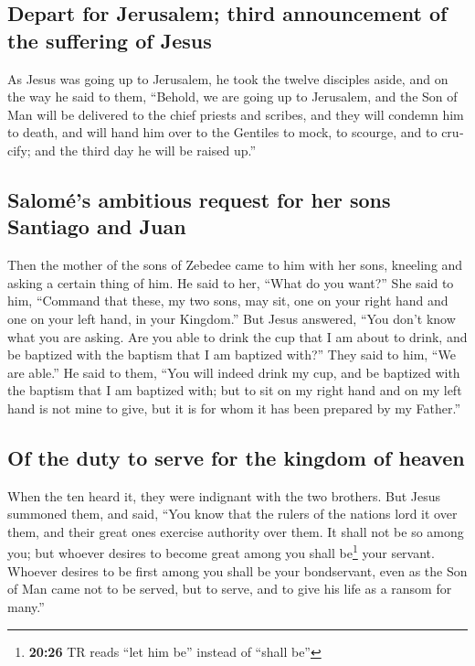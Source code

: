 \begin{paracol}{2}
\begin{otherlanguage}{english}
\hypertarget{depart-for-jerusalem-third-announcement-of-the-suffering-of-jesus}{%
\subsection{Depart for Jerusalem; third announcement of the suffering of
Jesus}\label{depart-for-jerusalem-third-announcement-of-the-suffering-of-jesus}}

 As Jesus was going up to Jerusalem, he took the twelve
disciples aside, and on the way he said to them, 
``Behold, we are going up to Jerusalem, and the Son of Man will be
delivered to the chief priests and scribes, and they will condemn him to
death,  and will hand him over to the Gentiles to mock,
to scourge, and to crucify; and the third day he will be raised up.''

\hypertarget{salomuxe9s-ambitious-request-for-her-sons-santiago-and-juan}{%
\subsection{Salomé's ambitious request for her sons Santiago and
Juan}\label{salomuxe9s-ambitious-request-for-her-sons-santiago-and-juan}}

 Then the mother of the sons of Zebedee came to him with
her sons, kneeling and asking a certain thing of him.  He
said to her, ``What do you want?'' She said to him, ``Command that
these, my two sons, may sit, one on your right hand and one on your left
hand, in your Kingdom.''  But Jesus answered, ``You don't
know what you are asking. Are you able to drink the cup that I am about
to drink, and be baptized with the baptism that I am baptized with?''
They said to him, ``We are able.''  He said to them,
``You will indeed drink my cup, and be baptized with the baptism that I
am baptized with; but to sit on my right hand and on my left hand is not
mine to give, but it is for whom it has been prepared by my Father.''

\hypertarget{of-the-duty-to-serve-for-the-kingdom-of-heaven}{%
\subsection{Of the duty to serve for the kingdom of
heaven}\label{of-the-duty-to-serve-for-the-kingdom-of-heaven}}

 When the ten heard it, they were indignant with the two
brothers.  But Jesus summoned them, and said, ``You know
that the rulers of the nations lord it over them, and their great ones
exercise authority over them.  It shall not be so among
you; but whoever desires to become great among you shall be\footnote{\textbf{20:26}
  TR reads ``let him be'' instead of ``shall be''} your servant.
 Whoever desires to be first among you shall be your
bondservant,  even as the Son of Man came not to be
served, but to serve, and to give his life as a ransom for many.''


\end{otherlanguage}
\end{paracol}
